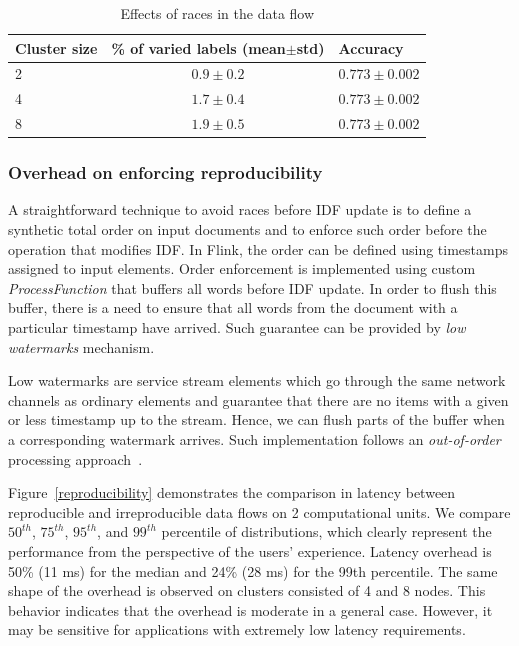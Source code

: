 \begin{table}[htbp]
\caption{Effects of races in the data flow}
\begin{threeparttable}
\begin{tabular}{lcl}
Cluster size    & \% of varied labels (mean$\pm$std) & Accuracy    \\
\hline
2   &   $0.9\pm0.2$    &   $0.773\pm0.002$    \\
4   &   $1.7\pm0.4$    &   $0.773\pm0.002$    \\
8   &   $1.9\pm0.5$    &   $0.773\pm0.002$    \\
\end{tabular}
\end{threeparttable}
\label{race_table}
\end{table}

\subsubsection{Overhead on enforcing reproducibility}

A straightforward technique to avoid races before IDF update is to define a synthetic total order on input documents and to enforce such order before the operation that modifies IDF. In Flink, the order can be defined using timestamps assigned to input elements. Order enforcement is implemented using custom {\it ProcessFunction} that buffers all words before IDF update. In order to flush this buffer, there is a need to ensure that all words from the document with a particular timestamp have arrived. Such guarantee can be provided by {\em low watermarks} mechanism. 

Low watermarks are service stream elements which go through the same network channels as ordinary elements and guarantee that there are no items with a given or less timestamp up to the stream. Hence, we can flush parts of the buffer when a corresponding watermark arrives. Such implementation follows an {\em out-of-order} processing approach~\cite{Li:2008:OPN:1453856.1453890}.

Figure~\ref{reproducibility} demonstrates the comparison in latency between reproducible and irreproducible data flows on 2 computational units. We compare $50^{th}$, $75^{th}$, $95^{th}$, and $99^{th}$ percentile of distributions, which clearly represent the performance from the perspective of the users' experience. Latency overhead is 50\% (11 ms) for the median and 24\% (28 ms) for the 99th percentile. The same shape of the overhead is observed on clusters consisted of 4 and 8 nodes. This behavior indicates that the overhead is moderate in a general case. However, it may be sensitive for applications with extremely low latency requirements.

